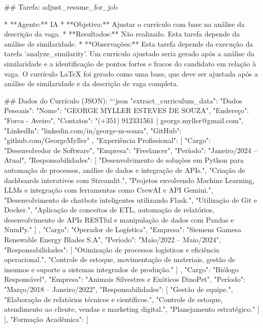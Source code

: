 ## Tarefa: adjust_resume_for_job

* **Agente:** IA
* **Objetivo:** Ajustar o currículo com base na análise da descrição da vaga.
* **Resultados:**  Não realizado. Esta tarefa depende da análise de similaridade.
* **Observações:** Esta tarefa depende da execução da tarefa 'analyze_similarity'. Um currículo ajustado seria gerado após a análise da similaridade e a identificação de pontos fortes e fracos do candidato em relação à vaga.  O currículo LaTeX foi gerado como uma base, que deve ser ajustada após a análise de similaridade e da descrição de vaga completa.

## Dados do Currículo (JSON):
```json
{
  "extract_curriculum_data": {
    "Dados Pessoais": {
      "Nome": "GEORGE MYLLER ESTEVES DE SOUZA",
      "Endereço": "Forca - Aveiro",
      "Contatos": "(+351) 912331561 | george.myller@gmail.com",
      "LinkedIn": "linkedin.com/in/george-m-souza",
      "GitHub": "github.com/GeorgeMyller"
    },
    "Experiência Profissional": [
      {
        "Cargo": "Desenvolvedor de Software",
        "Empresa": "Freelancer",
        "Período": "Janeiro/2024 – Atual",
        "Responsabilidades": [
          "Desenvolvimento de soluções em Python para automação de processos, análise de dados e integração de APIs.",
          "Criação de dashboards interativos com Streamlit.",
          "Projetos envolvendo Machine Learning, LLMs e integração com ferramentas como CrewAI e API Gemini.",
          "Desenvolvimento de chatbots inteligentes utilizando Flask.",
          "Utilização de Git e Docker.",
          "Aplicação de conceitos de ETL, automação de relatórios, desenvolvimento de APIs RESTful e manipulação de dados com Pandas e NumPy."
        ]
      },
      {
        "Cargo": "Operador de Logística",
        "Empresa": "Siemens Gamesa Renewable Energy Blades S.A",
        "Período": "Maio/2022 – Maio/2024",
        "Responsabilidades": [
          "Otimização de processos logísticos e eficiência operacional.",
          "Controle de estoque, movimentação de materiais, gestão de insumos e suporte a sistemas integrados de produção."
        ]
      },
      {
        "Cargo": "Biólogo Responsável",
        "Empresa": "Animais Silvestres e Exóticos DinoPet",
        "Período": "Março/2018 – Janeiro/2022",
        "Responsabilidades": [
          "Gestão de equipe.",
          "Elaboração de relatórios técnicos e científicos.",
          "Controle de estoque, atendimento ao cliente, vendas e marketing digital.",
          "Planejamento estratégico."
        ]
      }
    ],
    "Formação Acadêmica": [
}}
